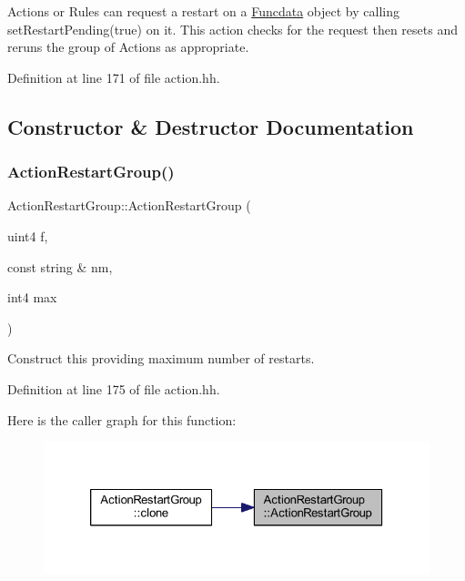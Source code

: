 Actions or Rules can request a restart on a \mbox{\hyperlink{class_funcdata}{Funcdata}} object by calling set\+Restart\+Pending(true) on it. This action checks for the request then resets and reruns the group of Actions as appropriate. 

Definition at line 171 of file action.\+hh.



\subsection{Constructor \& Destructor Documentation}
\mbox{\label{class_action_restart_group_af230c26a56dadb0f71c17f28ccc75876}} 
\subsubsection{\texorpdfstring{ActionRestartGroup()}{ActionRestartGroup()}}
{\footnotesize\ttfamily Action\+Restart\+Group\+::\+Action\+Restart\+Group (\begin{DoxyParamCaption}\item[{uint4}]{f,  }\item[{const string \&}]{nm,  }\item[{int4}]{max }\end{DoxyParamCaption})\hspace{0.3cm}{\ttfamily [inline]}}



Construct this providing maximum number of restarts. 



Definition at line 175 of file action.\+hh.

Here is the caller graph for this function\+:
\nopagebreak
\begin{figure}[H]
\begin{center}
\leavevmode
\includegraphics[width=326pt]{class_action_restart_group_af230c26a56dadb0f71c17f28ccc75876_icgraph}
\end{center}
\end{figure}


